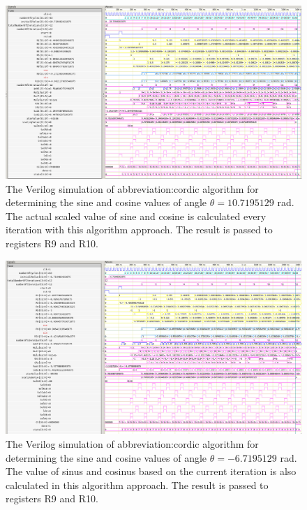 \documentclass[a4paper, twoside, 11pt]{article}
\begin{document}
        \begin{figure}[htbp!]
            \centering
            \includegraphics[width=1\textwidth]{src/png/inverted/cordic-verilog-whole-sim-10_719.png}
            \caption{The Verilog simulation of \gls{abbreviation:cordic} algorithm for determining the sine and cosine values of angle $\theta = 10.7195129$ rad. The actual scaled value of sine and cosine is calculated every iteration with this algorithm approach. The result is passed to registers R9 and R10.}
            \label{fig:cordic-verilog-whole-sim-10_719}
        \end{figure}

        \begin{figure}[htbp!]
            \centering
            \includegraphics[width=1\textwidth]{src/png/inverted/cordic-verilog-whole-sim_minus_6_7195129.png}
            \caption{The Verilog simulation of \gls{abbreviation:cordic} algorithm for determining the sine and cosine values of angle $\theta = - 6.7195129$ rad. The value of sinus and cosinus based on the current iteration is also calculated in this algorithm approach. The result is passed to registers R9 and R10.}
            \label{fig:cordic-verilog-whole-sim_minus_6_7195129}
        \end{figure}
\end{document}
